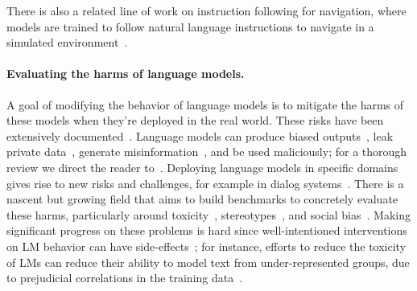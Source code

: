 There is also a related line of work on instruction following for navigation, where models are trained to follow natural language instructions to navigate in a simulated environment~\citep{bahdanau2018learning,abramson2020imitating,zhao2021evaluation}.

\paragraph{Evaluating the harms of language models.} A goal of modifying the behavior of language models is to mitigate the harms of these models when they're deployed in the real world. These risks have been extensively documented~\citep{bender2021dangers,bommasani2021opportunities,kenton2021alignment,weidinger2021ethical,tamkin2021understanding}. Language models can produce biased outputs~\citep{dhamala2021bold,liang2021towards,manela2021stereotype,caliskan2017semantics,kirk2021true}, leak private data~\citep{carlini2021extracting}, generate misinformation~\citep{solaiman2019release,buchanan2021truth}, and be used maliciously; for a thorough review we direct the reader to~\citet{weidinger2021ethical}. Deploying language models in specific domains gives rise to new risks and challenges, for example in dialog systems~\citep{henderson2018ethical,xu2020recipes,dinan2019build}. There is a nascent but growing field that aims to build benchmarks to concretely evaluate these harms, particularly around toxicity~\citep{gehman2020realtoxicityprompts}, stereotypes~\citep{nadeem2020stereoset}, and social bias~\citep{dhamala2021bold,nangia2020crows,rudinger2018gender}. Making significant progress on these problems is hard since well-intentioned interventions on LM behavior can have side-effects~\citep{welbl2021challenges,blodgett2020language}; for instance, efforts to reduce the toxicity of LMs can reduce their ability to model text from under-represented groups, due to prejudicial correlations in the training data~\citep{xu2021detoxifying}.

